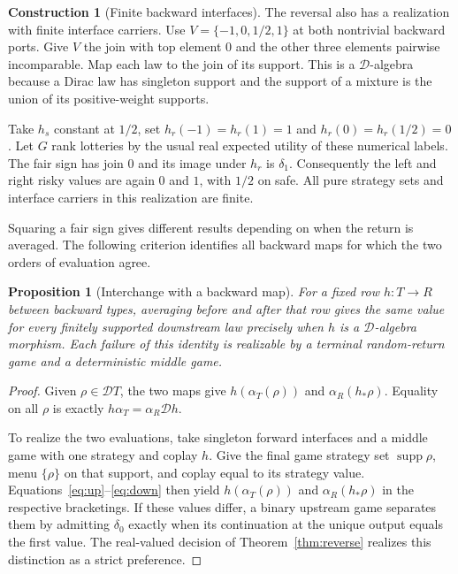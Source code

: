 \documentclass[11pt,a4paper]{article}
\newtheorem{proposition}[theorem]{Proposition}
\theoremstyle{definition}
\newtheorem*{construction}{Construction}
\newcommand{\D}{\mathcal D}
\newcommand{\supp}{\operatorname{supp}}
\begin{document}
\begin{construction}[Finite backward interfaces]
    The reversal also has a realization with finite interface carriers. Use $V=\{-1,0,1/2,1\}$ at both nontrivial backward ports. Give $V$ the join with top element $0$ and the other three elements pairwise incomparable. Map each law to the join of its support. This is a $\D$-algebra because a Dirac law has singleton support and the support of a mixture is the union of its positive-weight supports.

    Take $h_s$ constant at $1/2$, set $h_r(-1)=h_r(1)=1$ and $h_r(0)=h_r(1/2)=0$. Let $G$ rank lotteries by the usual real expected utility of these numerical labels. The fair sign has join $0$ and its image under $h_r$ is $\delta_1$. Consequently the left and right risky values are again $0$ and $1$, with $1/2$ on safe. All pure strategy sets and interface carriers in this realization are finite.
\end{construction}

Squaring a fair sign gives different results depending on when the return is averaged. The following criterion identifies all backward maps for which the two orders of evaluation agree.

\begin{proposition}[Interchange with a backward map]\label{prop:affine}
    For a fixed row $h:T\to R$ between backward types, averaging before and after that row gives the same value for every finitely supported downstream law precisely when $h$ is a $\D$-algebra morphism. Each failure of this identity is realizable by a terminal random-return game and a deterministic middle game.
\end{proposition}
\begin{proof}
    Given $\rho\in\D T$, the two maps give $h(\alpha_T(\rho))$ and $\alpha_R(h_*\rho)$. Equality on all $\rho$ is exactly $h\alpha_T=\alpha_R\D h$.

    To realize the two evaluations, take singleton forward interfaces and a middle game with one strategy and coplay $h$. Give the final game strategy set $\supp\rho$, menu $\{\rho\}$ on that support, and coplay equal to its strategy value. Equations~\eqref{eq:up}--\eqref{eq:down} then yield $h(\alpha_T(\rho))$ and $\alpha_R(h_*\rho)$ in the respective bracketings. If these values differ, a binary upstream game separates them by admitting $\delta_0$ exactly when its continuation at the unique output equals the first value. The real-valued decision of Theorem~\ref{thm:reverse} realizes this distinction as a strict preference.
\end{proof}
\end{document}
